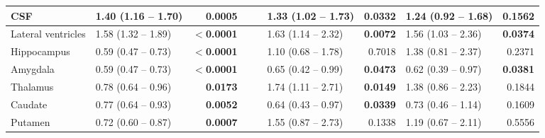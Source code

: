 \begin{sidewaystable}
{\begin{tabular}{|l|lr|lr|lr|lr|}
\hline
CSF & \textcolor[rgb]{0.2,0.2,0.2}{1.40 (1.16 -- 1.70)} & \textcolor[rgb]{0.2,0.2,0.2}{\textbf{0.0005}} & {\cellcolor[rgb]{0.753,0.753,0.753}} & {\cellcolor[rgb]{0.753,0.753,0.753}} & \textcolor[rgb]{0.2,0.2,0.2}{1.33 (1.02 -- 1.73)} & \textcolor[rgb]{0.2,0.2,0.2}{\textbf{0.0332}} & \textcolor[rgb]{0.2,0.2,0.2}{1.24 (0.92 -- 1.68)} & \textcolor[rgb]{0.2,0.2,0.2}{0.1562} \\ 
\hline
Lateral ventricles & \textcolor[rgb]{0.2,0.2,0.2}{1.58 (1.32 -- 1.89)} & \textbf{$<$0.0001} & {\cellcolor[rgb]{0.753,0.753,0.753}} & {\cellcolor[rgb]{0.753,0.753,0.753}} & \textcolor[rgb]{0.2,0.2,0.2}{1.63 (1.14 -- 2.32)} & \textcolor[rgb]{0.2,0.2,0.2}{\textbf{0.0072}} & \textcolor[rgb]{0.2,0.2,0.2}{1.56 (1.03 -- 2.36)} & \textcolor[rgb]{0.2,0.2,0.2}{\textbf{0.0374}} \\ 
\hline
Hippocampus & \textcolor[rgb]{0.2,0.2,0.2}{0.59 (0.47 -- 0.73)} & \textbf{$<$0.0001} & {\cellcolor[rgb]{0.753,0.753,0.753}} & {\cellcolor[rgb]{0.753,0.753,0.753}} & \textcolor[rgb]{0.2,0.2,0.2}{1.10 (0.68 -- 1.78)} & \textcolor[rgb]{0.2,0.2,0.2}{0.7018} & \textcolor[rgb]{0.2,0.2,0.2}{1.38 (0.81 -- 2.37)} & \textcolor[rgb]{0.2,0.2,0.2}{0.2371} \\ 
\hline
Amygdala & \textcolor[rgb]{0.2,0.2,0.2}{0.59 (0.47 -- 0.73)} & \textbf{$<$0.0001} & {\cellcolor[rgb]{0.753,0.753,0.753}} & {\cellcolor[rgb]{0.753,0.753,0.753}} & \textcolor[rgb]{0.2,0.2,0.2}{0.65 (0.42 -- 0.99)} & \textcolor[rgb]{0.2,0.2,0.2}{\textbf{0.0473}} & \textcolor[rgb]{0.2,0.2,0.2}{0.62 (0.39 -- 0.97)} & \textcolor[rgb]{0.2,0.2,0.2}{\textbf{0.0381}} \\ 
\hline
Thalamus & \textcolor[rgb]{0.2,0.2,0.2}{0.78 (0.64 -- 0.96)} & \textcolor[rgb]{0.2,0.2,0.2}{\textbf{0.0173}} & {\cellcolor[rgb]{0.753,0.753,0.753}} & {\cellcolor[rgb]{0.753,0.753,0.753}} & \textcolor[rgb]{0.2,0.2,0.2}{1.74 (1.11 -- 2.71)} & \textcolor[rgb]{0.2,0.2,0.2}{\textbf{0.0149}} & \textcolor[rgb]{0.2,0.2,0.2}{1.38 (0.86 -- 2.23)} & \textcolor[rgb]{0.2,0.2,0.2}{0.1844} \\ 
\hline
Caudate & \textcolor[rgb]{0.2,0.2,0.2}{0.77 (0.64 -- 0.93)} & \textcolor[rgb]{0.2,0.2,0.2}{\textbf{0.0052}} & {\cellcolor[rgb]{0.753,0.753,0.753}} & {\cellcolor[rgb]{0.753,0.753,0.753}} & \textcolor[rgb]{0.2,0.2,0.2}{0.64 (0.43 -- 0.97)} & \textcolor[rgb]{0.2,0.2,0.2}{\textbf{0.0339}} & \textcolor[rgb]{0.2,0.2,0.2}{0.73 (0.46 -- 1.14)} & \textcolor[rgb]{0.2,0.2,0.2}{0.1609} \\ 
\hline
Putamen & \textcolor[rgb]{0.2,0.2,0.2}{0.72 (0.60 -- 0.87)} & \textcolor[rgb]{0.2,0.2,0.2}{\textbf{0.0007}} & {\cellcolor[rgb]{0.753,0.753,0.753}} & {\cellcolor[rgb]{0.753,0.753,0.753}} & \textcolor[rgb]{0.2,0.2,0.2}{1.55 (0.87 -- 2.73)} & \textcolor[rgb]{0.2,0.2,0.2}{0.1338} & \textcolor[rgb]{0.2,0.2,0.2}{1.19 (0.67 -- 2.11)} & \textcolor[rgb]{0.2,0.2,0.2}{0.5556} \\ 

\end{tabular}}
\end{sidewaystable}
